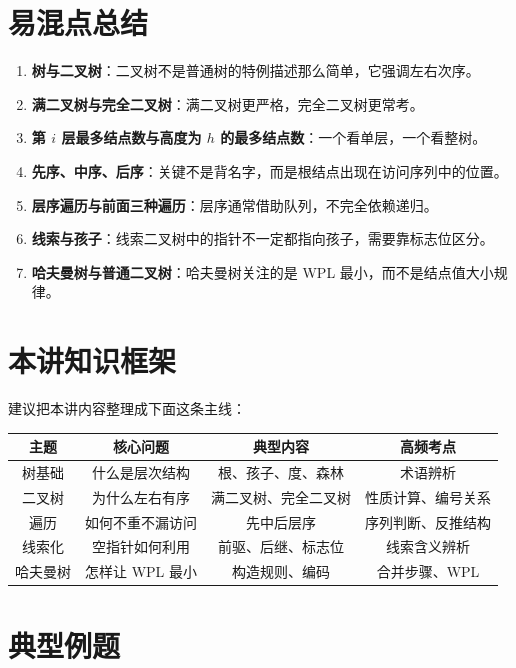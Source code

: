 \documentclass{../../note}
\begin{document}
\section{易混点总结}

\begin{enumerate}
  \item \textbf{树与二叉树}：二叉树不是普通树的特例描述那么简单，它强调左右次序。
  \item \textbf{满二叉树与完全二叉树}：满二叉树更严格，完全二叉树更常考。
  \item \textbf{第 $i$ 层最多结点数与高度为 $h$ 的最多结点数}：一个看单层，一个看整树。
  \item \textbf{先序、中序、后序}：关键不是背名字，而是根结点出现在访问序列中的位置。
  \item \textbf{层序遍历与前面三种遍历}：层序通常借助队列，不完全依赖递归。
  \item \textbf{线索与孩子}：线索二叉树中的指针不一定都指向孩子，需要靠标志位区分。
  \item \textbf{哈夫曼树与普通二叉树}：哈夫曼树关注的是 WPL 最小，而不是结点值大小规律。
\end{enumerate}

\section{本讲知识框架}

建议把本讲内容整理成下面这条主线：

\begin{center}
\begin{tabular}{|c|c|c|c|}
\hline
主题 & 核心问题 & 典型内容 & 高频考点 \\
\hline
树基础 & 什么是层次结构 & 根、孩子、度、森林 & 术语辨析 \\
\hline
二叉树 & 为什么左右有序 & 满二叉树、完全二叉树 & 性质计算、编号关系 \\
\hline
遍历 & 如何不重不漏访问 & 先中后层序 & 序列判断、反推结构 \\
\hline
线索化 & 空指针如何利用 & 前驱、后继、标志位 & 线索含义辨析 \\
\hline
哈夫曼树 & 怎样让 WPL 最小 & 构造规则、编码 & 合并步骤、WPL \\
\hline
\end{tabular}
\end{center}

\section{典型例题}
\end{document}
